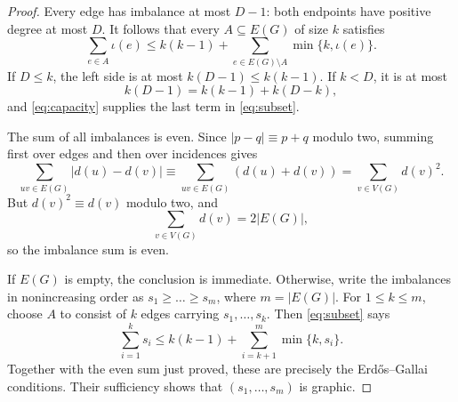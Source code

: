 \documentclass[11pt,reqno]{amsart}
\numberwithin{equation}{section}
\begin{document}
\begin{proof}
Every edge has imbalance at most $D-1$: both endpoints have positive
degree at most $D$.  It follows that every $A\subseteq E(G)$ of size $k$
satisfies
\begin{equation}\label{eq:subset}
  \sum_{e\in A}\iota(e)
  \le k(k-1)+\sum_{e\in E(G)\setminus A}\min\{k,\iota(e)\}.
\end{equation}
If $D\le k$, the left side is at most $k(D-1)\le k(k-1)$.  If $k<D$,
it is at most
\[
  k(D-1)=k(k-1)+k(D-k),
\]
and \eqref{eq:capacity} supplies the last term in \eqref{eq:subset}.

The sum of all imbalances is even.  Since $\lvert p-q\rvert\equiv p+q$
modulo two, summing first over edges and then over incidences gives
\[
  \sum_{uv\in E(G)}\lvert d(u)-d(v)\rvert
  \equiv \sum_{uv\in E(G)}(d(u)+d(v))
  =\sum_{v\in V(G)}d(v)^2.
\]
But $d(v)^2\equiv d(v)$ modulo two, and
\[
  \sum_{v\in V(G)}d(v)=2\lvert E(G)\rvert,
\]
so the imbalance sum is even.

If $E(G)$ is empty, the conclusion is immediate.  Otherwise, write the
imbalances in nonincreasing order as $s_1\ge\dots\ge s_m$, where
$m=\lvert E(G)\rvert$.  For $1\le k\le m$, choose $A$ to consist of
$k$ edges carrying $s_1,\dots,s_k$.  Then \eqref{eq:subset} says
\[
  \sum_{i=1}^{k}s_i
  \le k(k-1)+\sum_{i=k+1}^{m}\min\{k,s_i\}.
\]
Together with the even sum just proved, these are precisely the
Erd\H{o}s--Gallai conditions.  Their sufficiency shows that
$(s_1,\dots,s_m)$ is graphic.
\end{proof}
\end{document}
